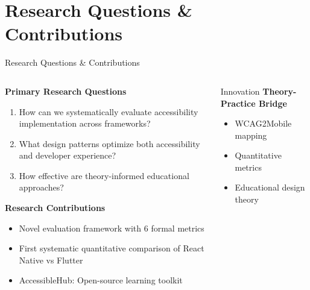 \documentclass[10pt,aspectratio=169]{beamer}
\begin{document}
\section{Research Questions \& Contributions}

\begin{frame}{Research Questions \& Contributions}
    \begin{columns}[c]
        \begin{column}{0.6\textwidth}
            \textbf{Primary Research Questions}
            \begin{enumerate}
                \item How can we systematically evaluate accessibility implementation across frameworks?
                \item What design patterns optimize both accessibility and developer experience?
                \item How effective are theory-informed educational approaches?
            \end{enumerate}
            
            \vspace{0.5cm}
            
            \textbf{Research Contributions}
            \begin{itemize}
                \item Novel evaluation framework with 6 formal metrics
                \item First systematic quantitative comparison of React Native vs Flutter
                \item AccessibleHub: Open-source learning toolkit
            \end{itemize}
        \end{column}
        \begin{column}{0.35\textwidth}
            \begin{block}{Innovation}
                \textbf{Theory-Practice Bridge}
                \begin{itemize}
                    \item WCAG2Mobile mapping
                    \item Quantitative metrics
                    \item Educational design theory
                \end{itemize}
            \end{block}
        \end{column}
    \end{columns}
\end{frame}
\end{document}
